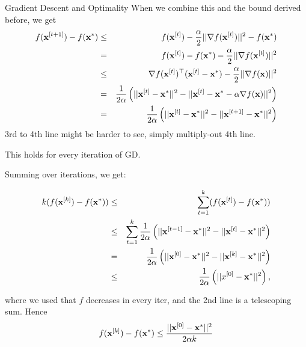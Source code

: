 \documentclass[11pt,compress,t,notes=noshow, xcolor=table]{beamer}
\begin{document}
\begin{vbframe}{Gradient Descent and Optimality}
            When we combine this and the bound derived before, we get
			\begin{eqnarray*}
				f(\mathbf{x}^{[t+1]}) - f(\mathbf{x}^\ast) &\leq& f(\mathbf{x}^{[t]})  - \frac{\alpha}{2}||\nabla f(\mathbf{x}^{[t]})||^2  - f(\mathbf{x}^\ast) \\
				&=& f(\mathbf{x}^{[t]})  - f(\mathbf{x}^\ast)  - \frac{\alpha}{2}||\nabla f(\mathbf{x}^{[t]})||^2 \\
				&\leq& \nabla f(\mathbf{x}^{[t]})^\top (\mathbf{x}^{[t]}-\mathbf{x}^*) - \frac{\alpha}{2}||\nabla f(\mathbf{x})||^2 \\
				&=& \frac{1}{2 \alpha} \left( ||\mathbf{x}^{[t]}-\mathbf{x}^\ast||^2 - || \mathbf{x}^{[t]} - \mathbf{x}^\ast - \alpha \nabla f(\mathbf{x})||^2 \right) \\
				&=& \frac{1}{2 \alpha} \left( ||\mathbf{x}^{[t]}-\mathbf{x}^\ast||^2 - || \mathbf{x}^{[t+1]} - \mathbf{x}^\ast ||^2 \right)
			\end{eqnarray*}
        3rd to 4th line might be harder to see, simply multiply-out 4th line.
        
		This holds for every iteration of GD. 
		
		\framebreak 
		
		Summing over iterations, we get: 
		
		\begin{eqnarray*}
			k ( f(\mathbf{x}^{[k]}) - f(\mathbf{x}^\ast)) &\leq& \sum_{t=1}^{k} ( f(\mathbf{x}^{[t]}) - f(\mathbf{x}^\ast))\\
            &\leq& \sum_{t=1}^{k} \frac{1}{2 \alpha} \left( ||\mathbf{x}^{[t-1]}-\mathbf{x}^\ast||^2 - || \mathbf{x}^{[t]} - \mathbf{x}^\ast ||^2 \right) \\
			&=& \frac{1}{2 \alpha}  \left( ||\mathbf{x}^{[0]}-\mathbf{x}^\ast||^2 - || \mathbf{x}^{[k]} - \mathbf{x}^\ast ||^2 \right) \\
			& \leq & \frac{1}{2 \alpha} \left( ||x^{[0]}-\mathbf{x}^\ast||^2 \right),
		\end{eqnarray*}
	
		where we used that $f$ decreases in every iter, and the 2nd line is a telescoping sum. Hence
		$$
		f(\mathbf{x}^{[k]}) - f(\mathbf{x}^\ast) \leq \frac{|| \mathbf{x}^{[0]} - \mathbf{x}^\ast ||^2}{2\alpha k}
		$$
%		
		
	\end{vbframe}	
	
	\endlecture
\end{document}
